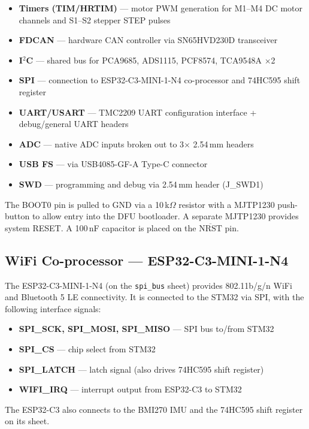 \documentclass[11pt,a4paper]{article}
\begin{document}
\begin{itemize}
  \item \textbf{Timers (TIM/HRTIM)} --- motor PWM generation for M1--M4 DC motor channels and S1--S2 stepper STEP pulses
  \item \textbf{FDCAN} --- hardware CAN controller via SN65HVD230D transceiver
  \item \textbf{I$^2$C} --- shared bus for PCA9685, ADS1115, PCF8574, TCA9548A $\times$2
  \item \textbf{SPI} --- connection to ESP32-C3-MINI-1-N4 co-processor and 74HC595 shift register
  \item \textbf{UART/USART} --- TMC2209 UART configuration interface + debug/general UART headers
  \item \textbf{ADC} --- native ADC inputs broken out to 3$\times$ 2.54\,mm headers
  \item \textbf{USB FS} --- via USB4085-GF-A Type-C connector
  \item \textbf{SWD} --- programming and debug via 2.54\,mm header (J\_SWD1)
\end{itemize}

The BOOT0 pin is pulled to GND via a 10\,k$\Omega$ resistor with a MJTP1230 push-button to allow entry into the DFU bootloader. A separate MJTP1230 provides system RESET. A 100\,nF capacitor is placed on the $\overline{\text{NRST}}$ pin.

\subsection{WiFi Co-processor --- ESP32-C3-MINI-1-N4}

The ESP32-C3-MINI-1-N4 (on the \texttt{spi\_bus} sheet) provides 802.11b/g/n WiFi and Bluetooth 5 LE connectivity. It is connected to the STM32 via SPI, with the following interface signals:

\begin{itemize}
  \item \textbf{SPI\_SCK, SPI\_MOSI, SPI\_MISO} --- SPI bus to/from STM32
  \item \textbf{SPI\_CS} --- chip select from STM32
  \item \textbf{SPI\_LATCH} --- latch signal (also drives 74HC595 shift register)
  \item \textbf{WIFI\_IRQ} --- interrupt output from ESP32-C3 to STM32
\end{itemize}

The ESP32-C3 also connects to the BMI270 IMU and the 74HC595 shift register on its sheet.
\end{document}

